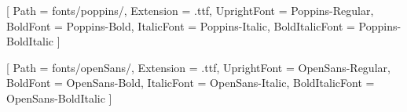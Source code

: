 
\usepackage[brazil]{babel}
\usepackage[none]{hyphenat}


\usepackage{fancyhdr}
\usepackage{multicol}
\usepackage{parskip}
\usepackage[
a4paper,
top=2cm,
bottom=1.4cm,
left=1.1cm,
right=1.1cm
]{geometry}


\usepackage{tcolorbox}
\usepackage{tikz}


\usepackage{graphicx}
\usepackage{hyperref}


\usepackage{fontspec}

\setmainfont{Poppins}[
  Path = fonts/poppins/,
  Extension = .ttf,
  UprightFont = Poppins-Regular,
  BoldFont = Poppins-Bold,
  ItalicFont = Poppins-Italic,
  BoldItalicFont = Poppins-BoldItalic
]

\newfontfamily{}[
  Path = fonts/openSans/,
  Extension = .ttf,
  UprightFont = OpenSans-Regular,
  BoldFont = OpenSans-Bold,
  ItalicFont = OpenSans-Italic,
  BoldItalicFont = OpenSans-BoldItalic
]
 
\usepackage{titlesec}
\usepackage{enumitem}